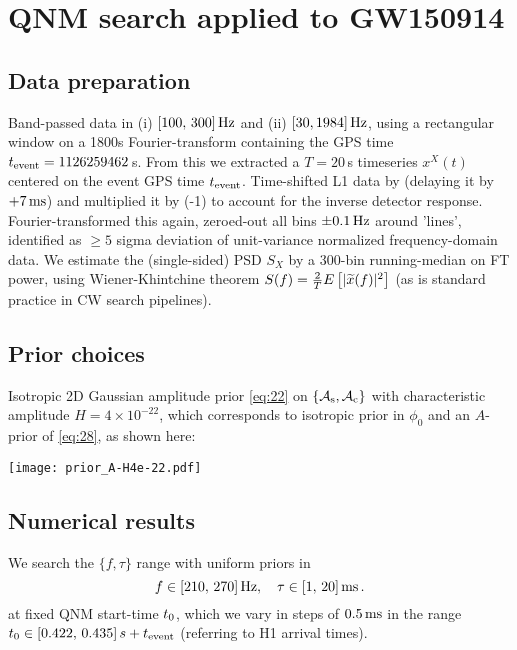 \documentclass[aps,prd,onecolumn,notitlepage,nofootinbib,superscriptaddress,altaffilletter,floatfix]{revtex4-1}
\begin{document}
\section{QNM search applied to GW150914}
\label{sec:qnm-search-applied}

\subsection{Data preparation}
\label{sec:data-preparation}

Band-passed data in (i) $[100,\,300]\,\mathrm{Hz}$ and (ii) $[30,1984]\,\mathrm{Hz}$, using a rectangular window on a 1800s Fourier-transform containing the GPS time
$t_{\mathrm{event}} = 1126259462\,$s.
From this we extracted a $T=20\,$s timeseries $x^X(t)$ centered on the event GPS time $t_{\mathrm{event}}$.
Time-shifted L1 data by (delaying it by $+7\,\mathrm{ms}$) and multiplied it by (-1) to account for the inverse detector response.
Fourier-transformed this again, zeroed-out all bins $\pm0.1\,\mathrm{Hz}$ around 'lines', identified as $\ge 5$ sigma deviation of unit-variance normalized
frequency-domain data.
We estimate the (single-sided) PSD $S_X$ by a 300-bin running-median on FT power, using Wiener-Khintchine theorem
$S(f) = \frac{2}{T} E\left[|\widetilde{x}(f)|^2\right]$ (as is standard practice in CW search pipelines).

\subsection{Prior choices}
\label{sec:prior-choices}

Isotropic 2D Gaussian amplitude prior \eqref{eq:22} on $\{\mathcal{A}_{\mathrm{s}},\mathcal{A}_{\mathrm{c}}\}$ with characteristic amplitude $H = 4\times10^{-22}$, which corresponds to
isotropic prior in $\phi_0$ and an $A$-prior of \eqref{eq:28}, as shown here:\\
\parbox{\textwidth}{
  \centering
  \texttt{[image: prior\_A-H4e-22.pdf]}
}

\subsection{Numerical results}
\label{sec:numerical-results}

We search the $\{f,\tau\}$ range with uniform priors in
\begin{equation}
  \label{eq:33}
  f\in[210,\,270]\,\mathrm{Hz},\quad
  \tau\in[1,\,20]\,\mathrm{ms}\,.
\end{equation}
at fixed QNM start-time $t_0$, which we vary in steps of $0.5\,\mathrm{ms}$ in the range $t_0\in [0.422,\,0.435]\,s + t_{\mathrm{event}}$
(referring to H1 arrival times).
\end{document}
